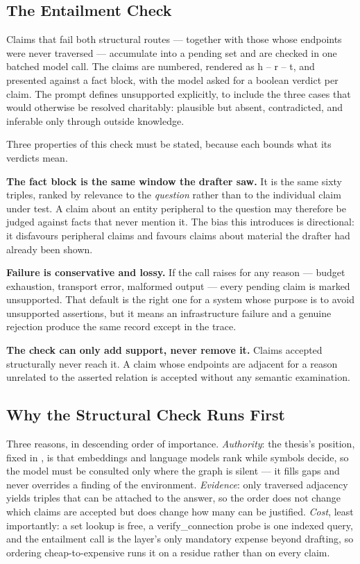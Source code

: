 \subsection{The Entailment Check}\label{sec:entailment-check}

Claims that fail both structural routes --- together with those whose endpoints
were never traversed --- accumulate into a pending set and are checked in one
batched model call. The claims are numbered, rendered as \textsf{h -- r -- t},
and presented against a fact block, with the model asked for a boolean verdict
per claim. The prompt defines unsupported explicitly, to include the three cases
that would otherwise be resolved charitably: plausible but absent, contradicted,
and inferable only through outside knowledge.

Three properties of this check must be stated, because each bounds what its
verdicts mean.

\textbf{The fact block is the same window the drafter saw.} It is the same sixty
triples, ranked by relevance to the \emph{question} rather than to the
individual claim under test. A claim about an entity peripheral to the question
may therefore be judged against facts that never mention it. The bias this
introduces is directional: it disfavours peripheral claims and favours claims
about material the drafter had already been shown.

\textbf{Failure is conservative and lossy.} If the call raises for any reason
--- budget exhaustion, transport error, malformed output --- every pending claim
is marked unsupported. That default is the right one for a system whose
purpose is to avoid unsupported assertions, but it means an infrastructure
failure and a genuine rejection produce the same record except in the trace.

\textbf{The check can only add support, never remove it.} Claims accepted
structurally never reach it. A claim whose endpoints are adjacent for a reason
unrelated to the asserted relation is accepted without any semantic examination.

\subsection{Why the Structural Check Runs First}

Three reasons, in descending order of importance. \emph{Authority}: the thesis's
position, fixed in , is that embeddings and language
models rank while symbols decide, so the model must be consulted only where the
graph is silent --- it fills gaps and never overrides a finding of the
environment. \emph{Evidence}: only traversed adjacency yields triples that can
be attached to the answer, so the order does not change which claims are
accepted but does change how many can be justified. \emph{Cost}, least
importantly: a set lookup is free, a \textsf{verify\_connection} probe is one
indexed query, and the entailment call is the layer's only mandatory expense
beyond drafting, so ordering cheap-to-expensive runs it on a residue rather than
on every claim.

